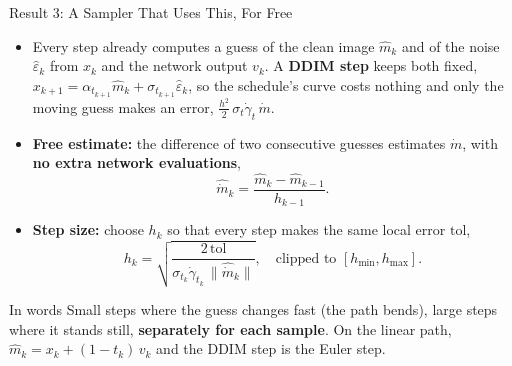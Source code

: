 \documentclass[aspectratio=169]{beamer}
\newcommand{\hl}[1]{\textcolor{coolpurple}{\textbf{#1}}}
\newcommand{\eps}{\hat\varepsilon}
\begin{document}
	\begin{frame}{Result 3: A Sampler That Uses This, For Free}
		\small
		\begin{itemize}
			\item Every step already computes a guess of the clean image $\hat m_k$ and of the noise $\eps_k$ from $x_k$ and the network output $v_k$. A \hl{DDIM step} keeps both fixed, $x_{k+1} = \alpha_{t_{k+1}}\hat m_k + \sigma_{t_{k+1}}\eps_k$, so the schedule's curve costs nothing and only the moving guess makes an error, $\frac{h^2}{2}\,\sigma_t\dot\gamma_t\,\dot m$.
			\item \hl{Free estimate:} the difference of two consecutive guesses estimates $\dot m$, with \hl{no extra network evaluations},
			$$ \widehat{\dot m}_k = \frac{\hat m_k - \hat m_{k - 1}}{h_{k - 1}}. $$
			\item \hl{Step size:} choose $h_k$ so that every step makes the same local error $\mathrm{tol}$,
			$$ h_k = \sqrt{\frac{2\,\mathrm{tol}}{\sigma_{t_k}\dot\gamma_{t_k}\,\|\widehat{\dot m}_k\|}}, \quad \text{clipped to } [h_{\min}, h_{\max}]. $$
		\end{itemize}
		\begin{block}{In words}
			\footnotesize Small steps where the guess changes fast (the path bends), large steps where it stands still, \hl{separately for each sample}. On the linear path, $\hat m_k = x_k + (1 - t_k)\,v_k$ and the DDIM step is the Euler step.
		\end{block}
	\end{frame}
\end{document}
